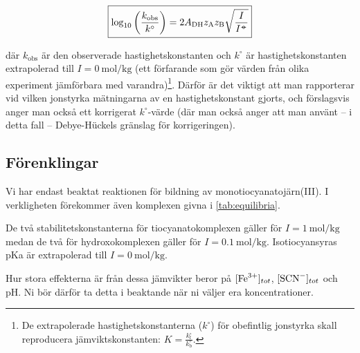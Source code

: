 \begin{align}
  \label{eq:kinetic-salt}
  \boxed{
  \log_{10} \left( \frac{k_\mathrm{obs}}{k^{\circ}} \right) = 2 A_\mathrm{DH} z_\mathrm{A} z_\mathrm{B} \sqrt{\frac{I}{I^{-\kern-5pt{\circ}\kern-5pt-}}}
  }
\end{align}

där $k_\mathrm{obs}$ är den observerade hastighetskonstanten och $k^{\circ}$ är
hastighetskonstanten extrapolerad till $I = \SI{0}{\mole\per\kg}$ (ett
förfarande som gör värden från olika experiment jämförbara med
varandra)\footnote{
 De extrapolerade hastighetskonstanterna ($k^\circ$) för obefintlig
 jonstyrka skall reproducera jämviktskonstanten: $K =
 \frac{k^\circ_\mathrm{f}}{k^\circ_\mathrm{b}}$.
}. Därför är det viktigt att man rapporterar vid vilken jonstyrka
mätningarna av en hastighetskonstant gjorts, och förslagsvis anger man
också ett korrigerat $k^\circ$-värde (där man också anger att man använt
-- i detta fall -- Debye-Hückels gränslag för korrigeringen).

\subsection{Förenklingar}
Vi har endast beaktat reaktionen för bildning av
monotiocyanatojärn(III). I verkligheten förekommer även komplexen givna i
\cref{tab:equilibria}.



De två stabilitetskonstanterna för tiocyanatokomplexen gäller för
$I=\SI{1}{\mol\per\kg}$ medan de två för hydroxokomplexen gäller för
$I=\SI{0.1}{\mol\per\kg}$. Isotiocyansyras pKa är extrapolerad till
$I=\SI{0}{\mole\per\kg}$.

Hur stora effekterna är från dessa jämvikter beror på
$[\ce{Fe^{3+}}]_{tot}$, $[\ce{SCN-}]_{tot}$ och pH. Ni bör därför ta
detta i beaktande när ni väljer era koncentrationer.


